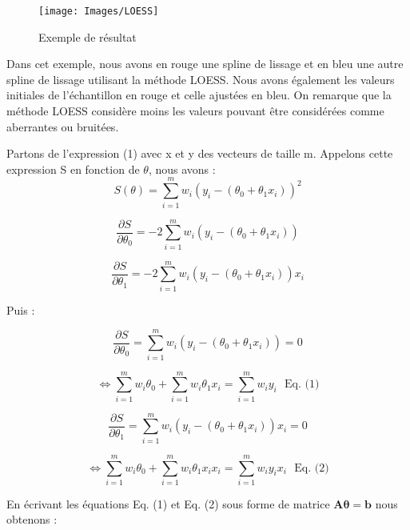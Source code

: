 \documentclass[a4paper,12pt]{article} %
\begin{document}
                    \begin{figure}
                        \centering
                        \texttt{[image: Images/LOESS]}
                        \caption{Exemple de résultat }
                        \label{fig:exemple}
                    \end{figure}
                    
                    Dans cet exemple, nous avons en rouge une spline de lissage et en bleu une autre spline de lissage utilisant la méthode LOESS.  Nous avons également les valeurs initiales de l'échantillon en rouge et celle ajustées en bleu. On remarque que la méthode LOESS considère moins les valeurs pouvant être considérées comme aberrantes ou bruitées.
                    
                    
                    Partons de l'expression (1) avec  x et y  des vecteurs de taille m. Appelons cette expression S en fonction de $\theta$, nous avons :
                    \[S(\theta) = \sum_{i=1}^m w_i \left( y_i - (\theta_0 + \theta_1 x_i) \right)^2\]
                    
                    \[\frac{\partial S}{\partial \theta_0} = -2 \sum_{i=1}^m w_i \left( y_i - (\theta_0 + \theta_1 x_i) \right) \]
                    
                    \[ \frac{\partial S}{\partial \theta_1} = -2 \sum_{i=1}^m w_i \left( y_i - (\theta_0 + \theta_1 x_i) \right) x_i \]
                    
                    
                    Puis :
                    
                    \[\frac{\partial S}{\partial \theta_0} = \sum_{i=1}^m w_i \left( y_i - (\theta_0 + \theta_1 x_i) \right)  = 0\]
                    
                    \[ \iff \sum_{i=1}^m w_i  \theta_0 + \sum_{i=1}^m w_i  \theta_1 x_i  = \sum_{i=1}^m w_i y_i  \ \ \ \text{Eq. (1)}\]
                    
                    \[\frac{\partial S}{\partial \theta_1} = \sum_{i=1}^m w_i \left( y_i - (\theta_0 + \theta_1 x_i) \right) x_i  = 0\] 
                    
                    \[\iff \sum_{i=1}^m w_i  \theta_0 + \sum_{i=1}^m w_i  \theta_1 x_i x_i  = \sum_{i=1}^m w_i y_i  x_i \ \ \ \text{Eq. (2)}\]
                    
                    
                    En écrivant les équations  Eq. (1) et Eq. (2) sous forme de matrice $\mathbf{A \theta = b}$ nous obtenons :
                    
\end{document}
